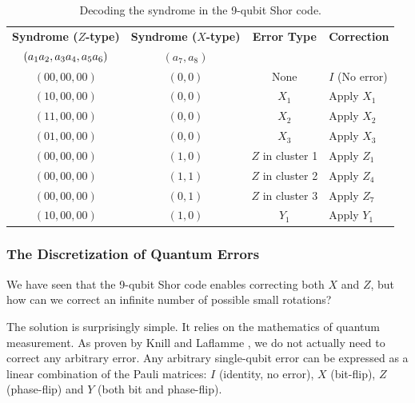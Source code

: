 \begin{table}[hbt]
    \centering
    \renewcommand{\arraystretch}{1.2}
    \begin{tabularx}{\textwidth}{@{}cccX@{}}
    \toprule
    \textbf{Syndrome ($Z$-type)} & \textbf{Syndrome ($X$-type)} & \textbf{Error Type} & \textbf{Correction} \\
    \textbf{$(a_1 a_2,\space a_3 a_4,\space a_5 a_6)$} & \textbf{$(a_7, a_8)$} &  &  \\
    \midrule
    $(00, 00, 00)$ & $(0, 0)$ & None & $I$ (No error) \\
    \midrule
    $(10, 00, 00)$ & $(0, 0)$ & $X_1$ & Apply $X_1$ \\
    $(11, 00, 00)$ & $(0, 0)$ & $X_2$ & Apply $X_2$ \\
    $(01, 00, 00)$ & $(0, 0)$ & $X_3$ & Apply $X_3$ \\
    \midrule
    $(00, 00, 00)$ & $(1, 0)$ & $Z$ in cluster 1 & Apply $Z_1$ \\
    $(00, 00, 00)$ & $(1, 1)$ & $Z$ in cluster 2 & Apply $Z_4$ \\
    $(00, 00, 00)$ & $(0, 1)$ & $Z$ in cluster 3 & Apply $Z_7$ \\
    \midrule
    $(10, 00, 00)$ & $(1, 0)$ & $Y_1$ & Apply $Y_1$ \\
    \bottomrule
    \end{tabularx}
    \caption[Decoding the syndrome in the 9-qubit Shor code.]{Decoding the syndrome in the 9-qubit Shor code.}
    \label{tab:9-shor-syndrome}
\end{table}

\subsubsection*{The Discretization of Quantum Errors}
We have seen that the 9-qubit Shor code enables correcting both $X$ and $Z$, but how can we correct an infinite number of possible small rotations? 

The solution is surprisingly simple. It relies on the mathematics of quantum measurement. As proven by Knill and Laflamme \cite{knill1997theory}, we do not actually need to correct any arbitrary error. Any arbitrary single-qubit error can be expressed as a linear combination of the Pauli matrices: $I$ (identity, no error), $X$ (bit-flip), $Z$ (phase-flip) and $Y$ (both bit and phase-flip).

